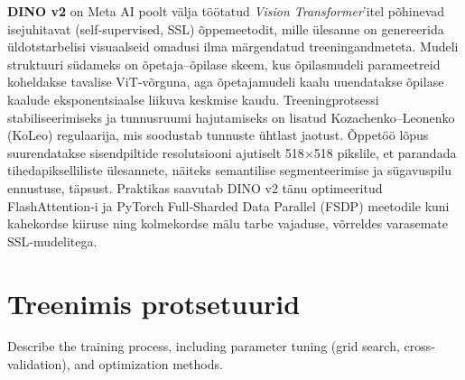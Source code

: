 \textbf{DINO v2} on Meta AI poolt välja töötatud \textit{Vision
Transformer}'itel põhinevad isejuhitavat (self‑supervised, SSL) õppemeetodit, mille
ülesanne on genereerida üldotstarbelisi visuaalseid omadusi ilma märgendatud
treeningandmeteta. Mudeli struktuuri südameks on õpetaja--õpilase skeem, kus
õpilasmudeli parameetreid koheldakse tavalise ViT‑võrguna, aga õpetajamudeli
kaalu uuendatakse õpilase kaalude eksponentsiaalse liikuva keskmise kaudu.
Treeningprotsessi stabiliseerimiseks ja tunnusruumi hajutamiseks on lisatud
Kozachenko--Leonenko (KoLeo) regulaarija, mis soodustab tunnuste ühtlast jaotust.
Õppetöö lõpus suurendatakse sisendpiltide resolutsiooni
ajutiselt 518\(\times \)518 pikslile, et parandada tihedapikselliliste
ülesannete, näiteks semantilise segmenteerimise ja sügavuspilu ennustuse,
täpsust. Praktikas saavutab DINO v2 tänu optimeeritud
FlashAttention‑i ja PyTorch Full‑Sharded Data Parallel (FSDP) meetodile kuni
kahekordse kiiruse ning kolmekordse mälu tarbe vajaduse, võrreldes varasemate SSL‑mudelitega. \cite{oquabDINOv2LearningRobust2024}

\section{Treenimis protsetuurid}
Describe the training process, including parameter tuning (grid search, cross-validation), and optimization methods.